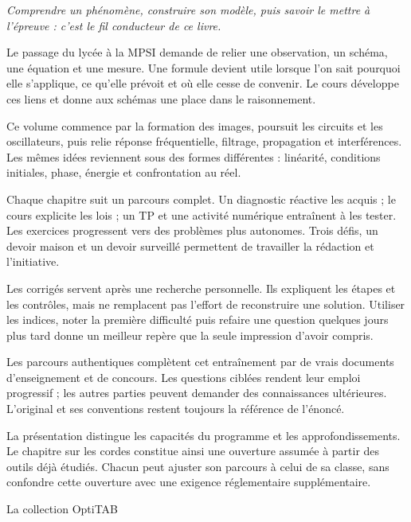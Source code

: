 \thispagestyle{mpsiFront}
{\fontsize{14}{20}\selectfont\itshape\color{otNavy}Comprendre un phénomène, construire son modèle, puis savoir le mettre à l’épreuve : c’est le fil conducteur de ce livre.\par}
\vspace{4mm}
Le passage du lycée à la MPSI demande de relier une observation, un schéma, une équation et une mesure. Une formule devient utile lorsque l’on sait pourquoi elle s’applique, ce qu’elle prévoit et où elle cesse de convenir. Le cours développe ces liens et donne aux schémas une place dans le raisonnement.
\par\vspace{2mm}
Ce volume commence par la formation des images, poursuit les circuits et les oscillateurs, puis relie réponse fréquentielle, filtrage, propagation et interférences. Les mêmes idées reviennent sous des formes différentes : linéarité, conditions initiales, phase, énergie et confrontation au réel.
\par\vspace{2mm}
Chaque chapitre suit un parcours complet. Un diagnostic réactive les acquis ; le cours explicite les lois ; un TP et une activité numérique entraînent à les tester. Les exercices progressent vers des problèmes plus autonomes. Trois défis, un devoir maison et un devoir surveillé permettent de travailler la rédaction et l’initiative.
\par\vspace{2mm}
Les corrigés servent après une recherche personnelle. Ils expliquent les étapes et les contrôles, mais ne remplacent pas l’effort de reconstruire une solution. Utiliser les indices, noter la première difficulté puis refaire une question quelques jours plus tard donne un meilleur repère que la seule impression d’avoir compris.
\par\vspace{2mm}
Les parcours authentiques complètent cet entraînement par de vrais documents d’enseignement et de concours. Les questions ciblées rendent leur emploi progressif ; les autres parties peuvent demander des connaissances ultérieures. L’original et ses conventions restent toujours la référence de l’énoncé.
\par\vspace{2mm}
La présentation distingue les capacités du programme et les approfondissements. Le chapitre sur les cordes constitue ainsi une ouverture assumée à partir des outils déjà étudiés. Chacun peut ajuster son parcours à celui de sa classe, sans confondre cette ouverture avec une exigence réglementaire supplémentaire.
\par
{\sffamily\small\color{otMuted}La collection OptiTAB}


